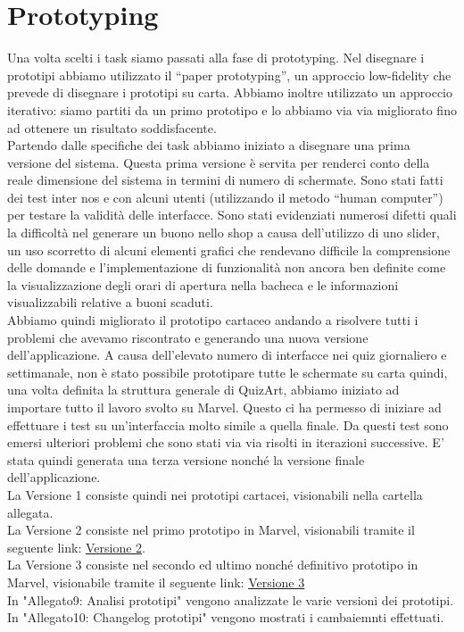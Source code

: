 \documentclass{article}
\begin{document}
\section{Prototyping}
Una volta scelti i task siamo passati alla fase di prototyping. Nel disegnare i prototipi abbiamo utilizzato il “paper prototyping”, un approccio low-fidelity che prevede di disegnare i prototipi su carta.
Abbiamo inoltre utilizzato un approccio iterativo: siamo partiti da un primo prototipo e lo abbiamo via via migliorato fino ad ottenere un risultato soddisfacente.
\\\indent
Partendo dalle specifiche dei task abbiamo iniziato a disegnare una prima versione del sistema. Questa prima versione è servita per renderci conto della reale dimensione del sistema in termini di numero di schermate. Sono stati fatti dei test inter nos e con alcuni utenti (utilizzando il metodo “human computer”) per testare la validità delle interfacce. Sono stati evidenziati numerosi difetti quali la difficoltà nel generare un buono nello shop a causa dell’utilizzo di uno slider, un uso scorretto di alcuni elementi grafici che rendevano difficile la comprensione delle domande e l’implementazione di funzionalità non ancora ben definite come la visualizzazione degli orari di apertura nella bacheca e le informazioni visualizzabili relative a buoni scaduti.
\\\indent
Abbiamo quindi migliorato il prototipo cartaceo andando a risolvere tutti i problemi che avevamo riscontrato e generando una nuova versione dell’applicazione. A causa dell’elevato numero di interfacce nei quiz giornaliero e settimanale, non è stato possibile prototipare tutte le schermate su carta quindi, una volta definita la struttura generale di QuizArt, abbiamo iniziato ad importare tutto il lavoro svolto su Marvel. Questo ci ha permesso di iniziare ad effettuare i test su un'interfaccia molto simile a quella finale. Da questi test sono emersi ulteriori problemi che sono stati via via risolti in iterazioni successive. E’ stata quindi generata una terza versione nonché la versione finale dell’applicazione.
\\\indent
La Versione 1 consiste quindi nei prototipi cartacei, visionabili nella cartella allegata.
\\\indent
La Versione 2 consiste nel primo prototipo in Marvel, visionabili tramite il seguente link: \href{https://marvelapp.com/prototype/bhcf89g/screen/76246379}{Versione 2}.
\\\indent
La Versione 3 consiste nel secondo ed ultimo nonché definitivo prototipo in Marvel, visionabile tramite il seguente link:
\href{https://marvelapp.com/prototype/bhcf89g/screen/75702736}{Versione 3}
\\\indent In "Allegato9: Analisi prototipi"\cite{Allegato9} vengono analizzate le varie versioni dei prototipi. In "Allegato10: Changelog prototipi"\cite{Allegato10} vengono mostrati i cambaiemnti effettuati.
\end{document}
